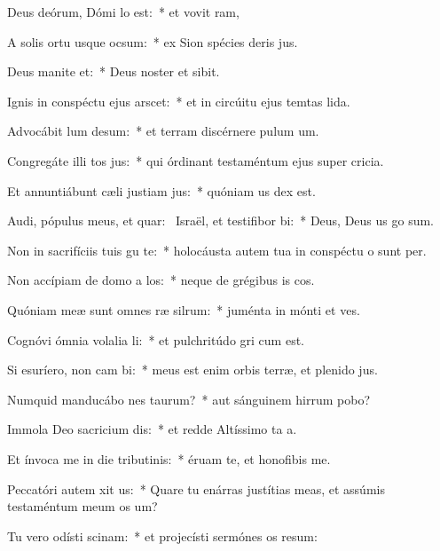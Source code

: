 \item Deus deórum, Dómi lo est:~* et vovit ram,
\item A solis ortu usque  ocsum:~* ex Sion spécies deris jus.
\item Deus manite et:~* Deus noster et  sibit.
\item Ignis in conspéctu ejus arscet:~* et in circúitu ejus temtas lida.
\item Advocábit lum desum:~* et terram discérnere pulum um.
\item Congregáte illi tos jus:~* qui órdinant testaméntum ejus super cricia.
\item Et annuntiábunt cæli justiam jus:~* quóniam us dex est.
\item Audi, pópulus meus, et quar:~\pscross{} Israël, et testifibor bi:~* Deus, Deus us go sum.
\item Non in sacrifíciis tuis gu te:~* holocáusta autem tua in conspéctu o sunt per.
\item Non accípiam de domo a los:~* neque de grégibus is cos.
\item Quóniam meæ sunt omnes ræ silrum:~* juménta in mónti et ves.
\item Cognóvi ómnia volalia li:~* et pulchritúdo gri cum est.
\item Si esuríero, non cam bi:~* meus est enim orbis terræ, et plenido jus.
\item Numquid manducábo nes taurum?~* aut sánguinem hirrum pobo?
\item Immola Deo sacricium dis:~* et redde Altíssimo ta a.
\item Et ínvoca me in die tributinis:~* éruam te, et honofibis me.
\item Peccatóri autem xit us:~* Quare tu enárras justítias meas, et assúmis testaméntum meum  os um?
\item Tu vero odísti scinam:~* et projecísti sermónes os resum:
